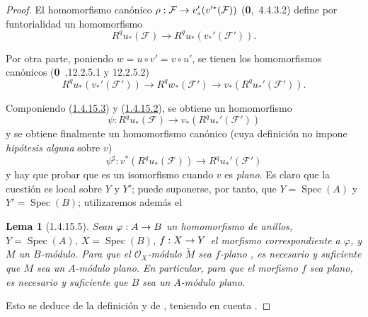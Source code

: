 \documentclass[10pt,oneside,openany]{book}
\theoremstyle{egaenv}\newtheorem*{env}{---}
\theoremstyle{egastatement}
\newtheorem*{lemma}{Lema}
\theoremstyle{egadescription}
\newcommand{\oldpage}[2][]{\marginnote{\normalfont\scriptsize\textbf{#1}\,|\,#2}\ignorespaces}
\renewcommand{\to}{\mathchoice{\longrightarrow}{\rightarrow}{\rightarrow}{\rightarrow}}
\begin{document}
\oldpage[III]{93}
\begin{proof}
El homomorfismo canónico
$\rho:\mathcal F\to v_*'(v'^*(\mathcal F))$ (\textbf{0},~4.4.3.2) define por funtorialidad un homomorfismo
\begin{equation}
\label{III.1.4.15.2-fr}
\tag{1.4.15.2}
R^qu_*(\mathcal F)\longrightarrow R^qu_*(v_*'(\mathcal F')).
\end{equation}

Por otra parte, poniendo $w=u\circ v'=v\circ u'$, se tienen los homomorfismos canónicos (\textbf{0}~,12.2.5.1 y 12.2.5.2)
\begin{equation}
\label{III.1.4.15.3-fr}
\tag{1.4.15.3}
R^qu_*(v_*'(\mathcal F'))\longrightarrow R^qw_*(\mathcal F')
\longrightarrow v_*(R^qu_*'(\mathcal F')).
\end{equation}

Componiendo (\hyperref[III.1.4.15.3]{1.4.15.3}) y (\hyperref[III.1.4.15.2]{1.4.15.2}), se obtiene un homomorfismo
\[
\psi:R^qu_*(\mathcal F)\longrightarrow v_*(R^qu_*'(\mathcal F'))
\]
y se obtiene finalmente un homomorfismo canónico (cuya definición no impone \emph{hipótesis alguna} sobre $v$)
\begin{equation}
\label{III.1.4.15.4-fr}
\tag{1.4.15.4}
\psi^\sharp:v^*(R^qu_*(\mathcal F))\longrightarrow R^qu_*'(\mathcal F')
\end{equation}
y hay que probar que es un isomorfismo cuando $v$ es \emph{plano}.
Es claro que la cuestión es local sobre $Y$ y $Y'$; puede suponerse, por tanto, que $Y=\operatorname{Spec}(A)$ y $Y'=\operatorname{Spec}(B)$; utilizaremos además el
\begin{lemma}[1.4.15.5]
\label{III.1.4.15.5-fr}
Sean $\varphi:A\to B$ un homomorfismo de anillos, $Y=\operatorname{Spec}(A)$, $X=\operatorname{Spec}(B)$, $f:X\to Y$ el morfismo correspondiente a $\varphi$, y $M$ un $B$-módulo.
Para que el $\mathcal O_X$-módulo $\widetilde M$ sea $f$-plano \textup{}, es necesario y suficiente que $M$ sea un $A$-módulo plano.
En particular, para que el morfismo $f$ sea plano, es necesario y suficiente que $B$ sea un $A$-módulo plano.
\end{lemma}

Esto se deduce de la definición  y de , teniendo en cuenta .


\end{proof}
\end{document}
